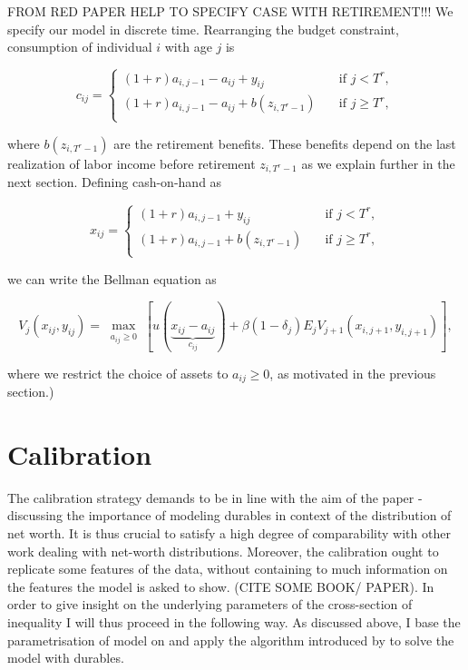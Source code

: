 \documentclass[a4paper,12pt]{article}
\begin{document}
FROM RED PAPER HELP TO SPECIFY CASE WITH RETIREMENT!!!
We specify our model in discrete time. Rearranging the budget constraint, consumption of individual $i$ with age $j$ is 

\begin{equation}
c_{ij} = 
  \begin{cases}
    (1+r)a_{i,j-1}-a_{ij}+y_{ij} & \quad \text{if } j < T^{r}, \\
    (1+r)a_{i,j-1}-a_{ij}+b(z_{i,T^{r}-1}) & \quad \text{if } j \geq T^{r},\\
  \end{cases}
\end{equation}

where $b(z_{i,T^{r}-1})$ are the retirement benefits. These benefits depend on the last realization of labor income before retirement $z_{i,T^{r}-1}$ as we explain further in the next section. Defining cash-on-hand as 

\begin{equation}
x_{ij} = 
  \begin{cases}
    (1+r)a_{i,j-1}+y_{ij} & \quad \text{if } j < T^{r}, \\
    (1+r)a_{i,j-1}+b(z_{i,T^{r}-1}) & \quad \text{if } j \geq T^{r},\\
  \end{cases}
\end{equation}

we can write the Bellman equation as 

\begin{equation}
V_{j}(x_{ij},y_{ij})= \max_{ \substack{a_{ij} \geq 0}}[u(\underbrace{x_{ij}-a_{ij}}_{c_{ij}}) + \beta(1-\delta_{j})E_{j}V_{j+1}(x_{i,j+1},y_{i,j+1})],
\end{equation}

where we restrict the choice of assets to $a_{ij} \geq 0$, as motivated in the previous section.)

\section{Calibration}
The calibration strategy demands to be in line with the aim of the paper - discussing the importance of modeling durables in context of the distribution of net worth. It is thus crucial to satisfy a high degree of comparability with other work dealing with net-worth distributions. Moreover, the calibration ought to replicate some features of the data, without containing to much information on the features the model is asked to show. (CITE SOME BOOK/ PAPER). 
In order to give insight on the underlying parameters of the cross-section of inequality I will thus proceed in the following way. As discussed above, I base the parametrisation of model on \cite{hintermaier2011} and apply the algorithm introduced by \cite{hintermaier2010} to solve the model with durables. 
\end{document}
